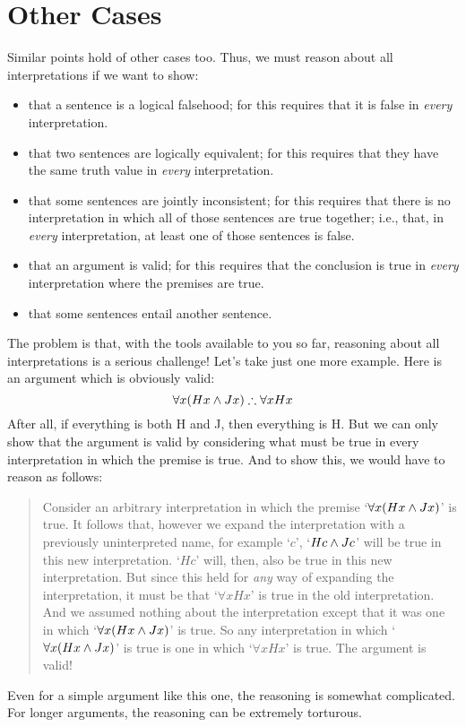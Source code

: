 \section{Other Cases}
Similar points hold of other cases too. Thus, we must reason about all interpretations if we want to show:
	\begin{itemize}
		\item that a sentence is a logical falsehood; for this requires that it is false in \emph{every} interpretation. 
		\item that two sentences are logically equivalent; for this requires that they have the same truth value in \emph{every} interpretation.
		\item that some sentences are jointly inconsistent; for this requires that there is no interpretation in which all of those sentences are true together; i.e., that, in \emph{every} interpretation, at  least one of those sentences is false.
		\item that an argument is valid; for this requires that the conclusion is true in \emph{every} interpretation where the premises are true. 
		\item that some sentences entail another sentence.
	\end{itemize}
The problem is that, with the tools available to you so far, reasoning about all interpretations is a serious challenge! Let's take just one more example. Here is an argument which is obviously valid:
	$$\forall x(Hx \wedge Jx) \mathrel{\therefore} \forall x Hx$$
After all, if everything is both H and J, then everything is H. But we can only show that the argument is valid by considering what must be true in every interpretation in which the premise is true. And to show this, we would have to reason as follows:
	\begin{quote}
		Consider an arbitrary interpretation in which the premise `$\forall x(Hx \wedge Jx)$' is true. It follows that, however we expand the interpretation with a previously uninterpreted name, for example `$c$', `$Hc \wedge Jc$' will be true in this new interpretation. `$Hc$' will, then, also be true in this new interpretation. But since this held for \emph{any} way of expanding the interpretation, it must be that `$\forall x Hx$' is true in the old interpretation. And we assumed nothing about the interpretation except that it was one in which `$\forall x(Hx \wedge Jx)$'  is true. So any interpretation in which `$\forall x(Hx \wedge Jx)$' is true is one in which `$\forall x Hx$' is true. The argument is valid!
\end{quote}
Even for a simple argument like this one, the reasoning is somewhat complicated. For longer arguments, the reasoning can be extremely torturous.

